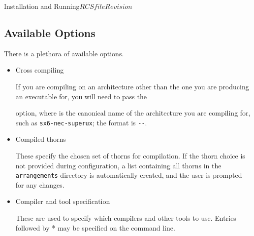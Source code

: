 \begin{cactuspart}{Installation and Running}{$RCSfile$}{$Revision$}
\subsection{Available Options}
\label{subsec:Compilation-Available_Options}

There is a plethora of available options.

\begin{itemize}

\item {Cross compiling}

If you are compiling on an architecture other than the one you are
producing an executable for, you will need to pass the

\begin{Lentry}
\item [\texttt{HOST\_MACHINE=\var{x-x-x}}]
\end{Lentry}
option, where \texttt{} is the canonical name of the architecture
you are compiling for, such as \texttt{sx6-nec-superux};  the format is
\texttt{--}.

\item {Compiled thorns}

These specify the chosen set of thorns for compilation. If the thorn choice is not provided
during configuration, a list containing all thorns in the
\texttt{arrangements} directory
is automatically created, and the user is prompted for any changes.


\item {Compiler and tool specification}

These are used to specify which compilers and other tools to use. Entries followed
by * may be specified on the command line.


\end{itemize}
\end{cactuspart}
